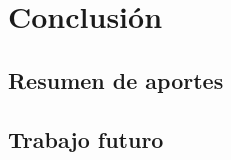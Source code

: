\chapter{Conclusi\'on}\label{conclussions}

\section{Resumen de aportes}



\section{Trabajo futuro}


